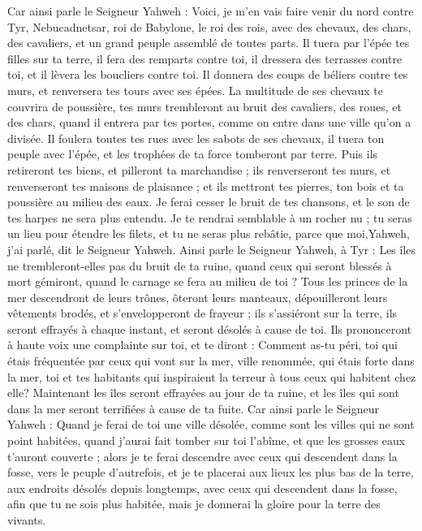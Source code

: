 \begin{multicols}{2}
Car ainsi parle le Seigneur Yahweh : Voici, je m'en vais faire venir du nord contre Tyr, Nebucadnetsar, roi de Babylone, le roi des rois, avec des chevaux, des chars, des cavaliers, et un grand peuple assemblé de toutes parts.
Il tuera par l'épée tes filles sur ta terre, il fera des remparts contre toi, il dressera des terrasses contre toi, et il lèvera les boucliers contre toi.
Il donnera des coups de béliers contre tes murs, et renversera tes tours avec ses épées.
La multitude de ses chevaux te couvrira de poussière, tes murs trembleront au bruit des cavaliers, des roues, et des chars, quand il entrera par tes portes, comme on entre dans une ville qu’on a divisée.
Il foulera toutes tes rues avec les sabots de ses chevaux, il tuera ton peuple avec l'épée, et les trophées de ta force tomberont par terre\FTNT{}.
Puis ils retireront tes biens, et pilleront ta marchandise ; ils renverseront tes murs, et renverseront tes maisons de plaisance ; et ils mettront tes pierres, ton bois et ta poussière au milieu des eaux.
Je ferai cesser le bruit de tes chansons, et le son de tes harpes ne sera plus entendu.
Je te rendrai semblable à un rocher nu ; tu seras un lieu pour étendre les filets, et tu ne seras plus rebâtie, parce que moi,Yahweh, j'ai parlé, dit le Seigneur Yahweh.
Ainsi parle le Seigneur Yahweh, à Tyr : Les îles ne trembleront-elles pas du bruit de ta ruine, quand ceux qui seront blessés à mort gémiront, quand le carnage se fera au milieu de toi ?
Tous les princes de la mer descendront de leurs trônes, ôteront leurs manteaux, dépouilleront leurs vêtements brodés, et s’envelopperont de frayeur ; ils s'assiéront sur la terre, ils seront effrayés à chaque instant, et seront désolés à cause de toi.
Ils prononceront à haute voix une complainte sur toi, et te diront : Comment as-tu péri, toi qui étais fréquentée par ceux qui vont sur la mer, ville renommée, qui étais forte dans la mer, toi et tes habitants qui inspiraient la terreur à tous ceux qui habitent chez elle\FTNT{}?
Maintenant les îles seront effrayées au jour de ta ruine, et les îles qui sont dans la mer seront terrifiées à cause de ta fuite.
Car ainsi parle le Seigneur Yahweh : Quand je ferai de toi une ville désolée, comme sont les villes qui ne sont point habitées, quand j'aurai fait tomber sur toi l'abîme, et que les grosses eaux t'auront couverte ;
alors je te ferai descendre avec ceux qui descendent dans la fosse, vers le peuple d'autrefois, et je te placerai aux lieux les plus bas de la terre, aux endroits désolés depuis longtemps, avec ceux qui descendent dans la fosse, afin que tu ne sois plus habitée, mais je donnerai la gloire pour la terre des vivants.

\end{multicols}
